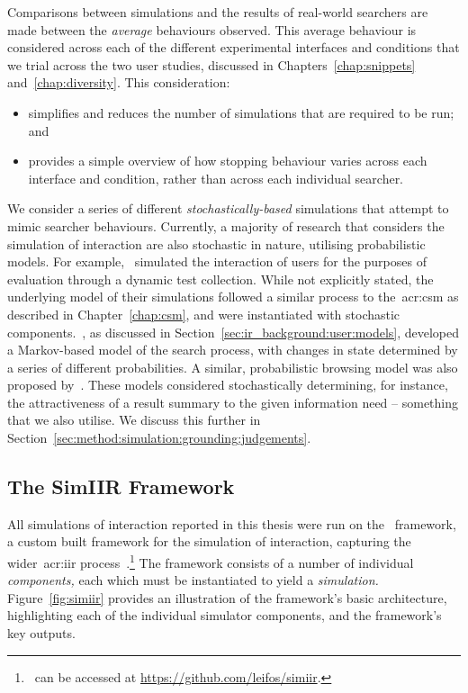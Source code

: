  Comparisons between simulations and the results of real-world searchers are made between the \emph{average} behaviours observed. This average behaviour is considered across each of the different experimental interfaces and conditions that we trial across the two user studies, discussed in Chapters~\ref{chap:snippets} and~\ref{chap:diversity}. This consideration:

\begin{itemize}
    \item{simplifies and reduces the number of simulations that are required to be run; and}
    \item{provides a simple overview of how stopping behaviour varies across each interface and condition, rather than across each individual searcher.}
\end{itemize}

 We consider a series of different \emph{stochastically-based} simulations that attempt to mimic searcher behaviours. Currently, a majority of research that considers the simulation of interaction are also stochastic in nature, utilising probabilistic models. For example,~\cite{carterette2011effectiveness_evaluation} simulated the interaction of users for the purposes of evaluation through a dynamic test collection. While not explicitly stated, the underlying model of their simulations followed a similar process to the~\gls{acr:csm} as described in Chapter~\ref{chap:csm}, and were instantiated with stochastic components.~\cite{baskaya2013behavioural_factors}, as discussed in Section~\ref{sec:ir_background:user:models}, developed a Markov-based model of the search process, with changes in state determined by a series of different probabilities. A similar, probabilistic browsing model was also proposed by~\cite{yilmaz2010browsing_utility}. These models considered stochastically determining, for instance, the attractiveness of a result summary to the given information need -- something that we also utilise. We discuss this further in Section~\ref{sec:method:simulation:grounding:judgements}.

\subsection{The SimIIR Framework}\label{sec:method:simulation:simiir}
All simulations of interaction reported in this thesis were run on the \simiir~framework, a custom built framework for the simulation of interaction, capturing the wider~\gls{acr:iir} process~\citep{maxwell2016simiir}.\footnote{\simiir~can be accessed at \url{https://github.com/leifos/simiir}. } The framework consists of a number of individual \emph{components,} each which must be instantiated to yield a \emph{simulation.} Figure~\ref{fig:simiir} provides an illustration of the framework's basic architecture, highlighting each of the individual simulator components, and the framework's key outputs.

